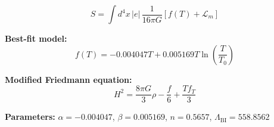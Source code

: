 
\begin{equation}
  S = \int d^4x \, |e| \, \frac{1}{16\pi G} \left[ f(T) + \mathcal{L}_m \right]
\end{equation}

\textbf{Best-fit model:}
\begin{equation}
  f(T) = -0.004047 T + 0.005169 T \ln\!\left(\frac{T}{T_0}\right)
\end{equation}

\textbf{Modified Friedmann equation:}
\begin{equation}
  H^2 = \frac{8\pi G}{3} \rho - \frac{f}{6} + \frac{T f_T}{3}
\end{equation}

\textbf{Parameters:}
$\alpha = -0.004047$, \quad
$\beta = 0.005169$, \quad
$n = 0.5657$, \quad
$\Lambda_{\text{BI}} = 558.8562$